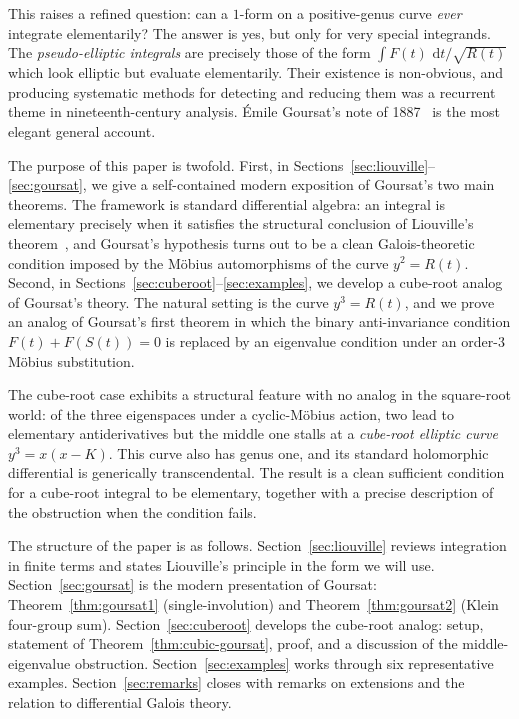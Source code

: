 \documentclass[11pt,a4paper]{article}
\theoremstyle{plain}
\theoremstyle{definition}
\theoremstyle{remark}
\renewcommand{\d}{\,\mathrm{d}}
\begin{document}
This raises a refined question: can a $1$-form on a positive-genus curve \emph{ever} integrate elementarily? The answer is yes, but only for very special integrands. The \emph{pseudo-elliptic integrals} are precisely those of the form $\int F(t)\,\d t/\sqrt{R(t)}$ which look elliptic but evaluate elementarily. Their existence is non-obvious, and producing systematic methods for detecting and reducing them was a recurrent theme in nineteenth-century analysis. \'Emile Goursat's note of 1887~\cite{Goursat1887} is the most elegant general account.

The purpose of this paper is twofold. First, in Sections~\ref{sec:liouville}--\ref{sec:goursat}, we give a self-contained modern exposition of Goursat's two main theorems. The framework is standard differential algebra: an integral is elementary precisely when it satisfies the structural conclusion of Liouville's theorem~\cite{Rosenlicht1972}, and Goursat's hypothesis turns out to be a clean Galois-theoretic condition imposed by the M\"obius automorphisms of the curve $y^2 = R(t)$. Second, in Sections~\ref{sec:cuberoot}--\ref{sec:examples}, we develop a cube-root analog of Goursat's theory. The natural setting is the curve $y^3 = R(t)$, and we prove an analog of Goursat's first theorem in which the binary anti-invariance condition $F(t)+F(S(t))=0$ is replaced by an eigenvalue condition under an order-$3$ M\"obius substitution.

The cube-root case exhibits a structural feature with no analog in the square-root world: of the three eigenspaces under a cyclic-Möbius action, two lead to elementary antiderivatives but the middle one stalls at a \emph{cube-root elliptic curve} $y^3=x(x-K)$. This curve also has genus one, and its standard holomorphic differential is generically transcendental. The result is a clean sufficient condition for a cube-root integral to be elementary, together with a precise description of the obstruction when the condition fails.

\medskip

The structure of the paper is as follows. Section~\ref{sec:liouville} reviews integration in finite terms and states Liouville's principle in the form we will use. Section~\ref{sec:goursat} is the modern presentation of Goursat: Theorem~\ref{thm:goursat1} (single-involution) and Theorem~\ref{thm:goursat2} (Klein four-group sum). Section~\ref{sec:cuberoot} develops the cube-root analog: setup, statement of Theorem~\ref{thm:cubic-goursat}, proof, and a discussion of the middle-eigenvalue obstruction. Section~\ref{sec:examples} works through six representative examples. Section~\ref{sec:remarks} closes with remarks on extensions and the relation to differential Galois theory.
\end{document}
